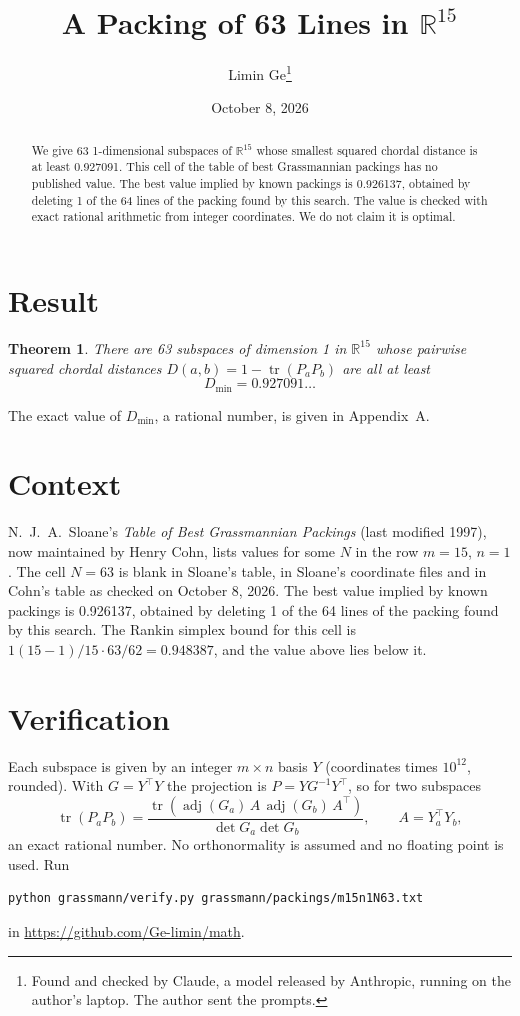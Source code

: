 \documentclass[11pt,a4paper]{article}
\title{A Packing of 63 Lines in $\mathbb{R}^{15}$}
\author{Limin Ge\thanks{Found and checked by Claude, a model released by Anthropic, running on the author's laptop. The author sent the prompts.}}
\date{October 8, 2026}
\newtheorem*{theorem}{Theorem}
\begin{document}
\maketitle
\begin{abstract}
We give 63 1-dimensional subspaces of $\mathbb{R}^{15}$ whose smallest squared chordal distance is at least 0.927091. This cell of the table of best Grassmannian packings has no published value. The best value implied by known packings is 0.926137, obtained by deleting 1 of the 64 lines of the packing found by this search. The value is checked with exact rational arithmetic from integer coordinates. We do not claim it is optimal.
\end{abstract}

\section{Result}
\begin{theorem}
There are 63 subspaces of dimension 1 in $\mathbb{R}^{15}$ whose pairwise squared chordal distances $D(a,b) = 1 - \operatorname{tr}(P_aP_b)$ are all at least
\[ D_{\min} = 0.927091\ldots \]
\end{theorem}
The exact value of $D_{\min}$, a rational number, is given in Appendix~A.


\section{Context}
N.~J.~A.~Sloane's \emph{Table of Best Grassmannian Packings} (last modified 1997), now maintained by Henry Cohn, lists values for some $N$ in the row $m=15$, $n=1$. The cell $N=63$ is blank in Sloane's table, in Sloane's coordinate files and in Cohn's table as checked on October 8, 2026. The best value implied by known packings is 0.926137, obtained by deleting 1 of the 64 lines of the packing found by this search. The Rankin simplex bound for this cell is $1(15-1)/15\cdot 63/62 = 0.948387$, and the value above lies below it.


\section{Verification}
Each subspace is given by an integer $m\times n$ basis $Y$ (coordinates times $10^{12}$, rounded). With $G=Y^\top Y$ the projection is $P=YG^{-1}Y^\top$, so for two subspaces
\[ \operatorname{tr}(P_aP_b)=\frac{\operatorname{tr}(\operatorname{adj}(G_a)\,A\,\operatorname{adj}(G_b)\,A^\top)}{\det G_a\det G_b},\qquad A=Y_a^\top Y_b, \]
an exact rational number. No orthonormality is assumed and no floating point is used. Run
\begin{verbatim}
python grassmann/verify.py grassmann/packings/m15n1N63.txt
\end{verbatim}
in \url{https://github.com/Ge-limin/math}.
\end{document}
